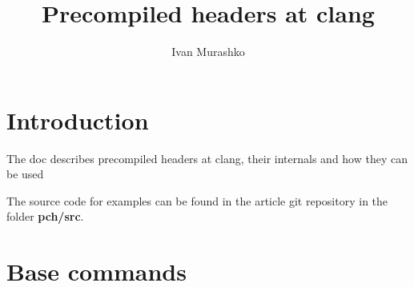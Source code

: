 \documentclass[14pt,a4paper]{article}
\title{Precompiled headers at clang}
\author{Ivan Murashko}
\date{}
\begin{document}
\maketitle
\tableofcontents

\section*{Introduction}
The doc describes precompiled headers at clang, their internals and
how they can be used

The source code for examples can be found in the article git
repository \cite{github:articles_ivanmurashko} in the folder 
\textbf{pch/src}.

\section{Base commands}


  
     
\end{document}
